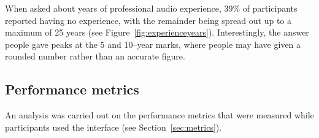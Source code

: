 When asked about years of professional audio experience, 39\% of participants reported having no experience, with the
remainder being spread out up to a maximum of 25 years (see Figure~\ref{fig:experienceyears}). Interestingly, the
answer people gave peaks at the 5 and 10--year marks, where people may have given a rounded number rather than an
accurate figure.



\subsection{Performance metrics}\label{sec:studymetrics}
An analysis was carried out on the performance metrics that were measured while participants used the interface (see
Section~\ref{sec:metrics}).

